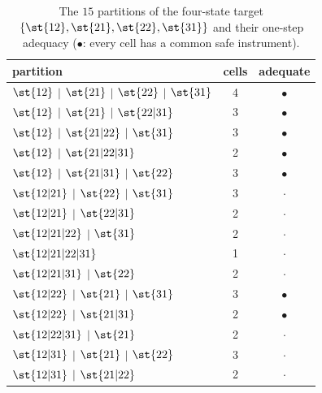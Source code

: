 \begin{table}[H]
\centering\small
\caption{The $15$ partitions of the four-state target $\{\st{12},\st{21},\st{22},\st{31}\}$ and their one-step adequacy ($\bullet$: every cell has a common safe instrument).}
\label{tab:target}
\begin{tabular}{lcc}
\toprule
partition & cells & adequate \\
\midrule
$\st{12}$ $\mid$ $\st{21}$ $\mid$ $\st{22}$ $\mid$ $\st{31}$ & 4 & $\bullet$ \\
$\st{12}$ $\mid$ $\st{21}$ $\mid$ $\st{22|31}$ & 3 & $\bullet$ \\
$\st{12}$ $\mid$ $\st{21|22}$ $\mid$ $\st{31}$ & 3 & $\bullet$ \\
$\st{12}$ $\mid$ $\st{21|22|31}$ & 2 & $\bullet$ \\
$\st{12}$ $\mid$ $\st{21|31}$ $\mid$ $\st{22}$ & 3 & $\bullet$ \\
$\st{12|21}$ $\mid$ $\st{22}$ $\mid$ $\st{31}$ & 3 & $\cdot$ \\
$\st{12|21}$ $\mid$ $\st{22|31}$ & 2 & $\cdot$ \\
$\st{12|21|22}$ $\mid$ $\st{31}$ & 2 & $\cdot$ \\
$\st{12|21|22|31}$ & 1 & $\cdot$ \\
$\st{12|21|31}$ $\mid$ $\st{22}$ & 2 & $\cdot$ \\
$\st{12|22}$ $\mid$ $\st{21}$ $\mid$ $\st{31}$ & 3 & $\bullet$ \\
$\st{12|22}$ $\mid$ $\st{21|31}$ & 2 & $\bullet$ \\
$\st{12|22|31}$ $\mid$ $\st{21}$ & 2 & $\cdot$ \\
$\st{12|31}$ $\mid$ $\st{21}$ $\mid$ $\st{22}$ & 3 & $\cdot$ \\
$\st{12|31}$ $\mid$ $\st{21|22}$ & 2 & $\cdot$ \\
\bottomrule
\end{tabular}
\end{table}
